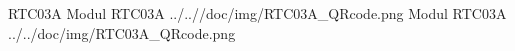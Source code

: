 \uvod
{RTC03A}
{Modul RTC03A}
{}
{../..//doc/img/RTC03A_QRcode.png}
{Modul RTC03A}
{ }
{../../doc/img/RTC03A_QRcode.png}